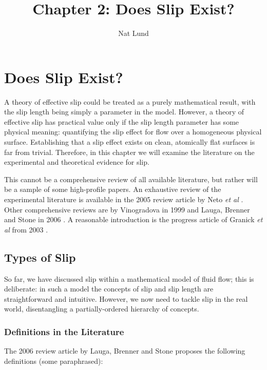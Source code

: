 \documentclass[12pt, a4paper, twoside, openright]{book}
\author{Nat Lund}
\title{Chapter 2: Does Slip Exist?}
\begin{document}
\chapter{Does Slip Exist?}\label{C:slip}


A theory of effective slip could be treated as a purely mathematical result, with the slip length being simply a parameter in the model.  However, a theory of effective slip has practical value only if the slip length parameter has some physical meaning: quantifying the slip effect for flow over a homogeneous physical surface.  Establishing that a slip effect exists on clean, atomically flat surfaces is far from trivial.  Therefore, in this chapter we will examine the literature on the experimental and theoretical evidence for slip.

This cannot be a comprehensive review of all available literature, but rather will be a sample of some high-profile papers.
An exhaustive review of the experimental literature is available in the 2005 review article by Neto \emph{et al} \cite{NetoReview2005}. Other comprehensive reviews are by Vinogradova in 1999 \cite{VinogradovaReview1999} and Lauga, Brenner and Stone in 2006 \cite{LaugaReview2006}. A reasonable introduction is the progress article of Granick \emph{et al} from 2003 \cite{GranickReview2003}.

\section{Types of Slip}

So far, we have discussed slip within a mathematical model of fluid flow; this is deliberate: in such a model the concepts of slip and slip length are straightforward and intuitive. However, we now need to tackle slip in the real world, disentangling a partially-ordered hierarchy of concepts.

\clearpage
\subsection{Definitions in the Literature}

The 2006 review article by Lauga, Brenner and Stone \cite{LaugaReview2006} proposes the following definitions (some paraphrased):
\end{document}
